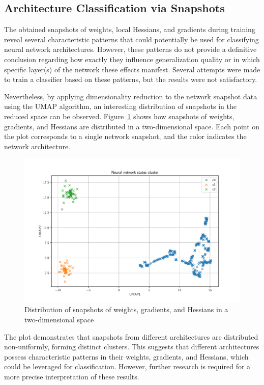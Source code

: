 \documentclass[a4paper,12pt]{article}
\begin{document}
\subsection{Architecture Classification via Snapshots}

The obtained snapshots of weights, local Hessians, and gradients during training reveal several
characteristic patterns that could potentially be used for classifying neural network architectures. However,
these patterns do not provide a definitive conclusion regarding how exactly they influence generalization
quality or in which specific layer(s) of the network these effects manifest. Several attempts were made to
train a classifier based on these patterns, but the results were not satisfactory.

Nevertheless, by applying dimensionality reduction to the network snapshot data using the UMAP algorithm, an
interesting distribution of snapshots in the reduced space can be observed. Figure~\ref{fig:umap} shows how
snapshots of weights, gradients, and Hessians are distributed in a two-dimensional space. Each point on the
plot corresponds to a single network snapshot, and the color indicates the network architecture.

\begin{figure}[ht]
  \centering
  \includegraphics[width=1\linewidth]{resources_en/umap.pdf}
  \caption{Distribution of snapshots of weights, gradients, and Hessians in a two-dimensional space}
  \label{fig:umap}
\end{figure}

The plot demonstrates that snapshots from different architectures are distributed non-uniformly, forming
distinct clusters. This suggests that different architectures possess characteristic patterns in their
weights, gradients, and Hessians, which could be leveraged for classification. However, further research is
required for a more precise interpretation of these results.
\end{document}
